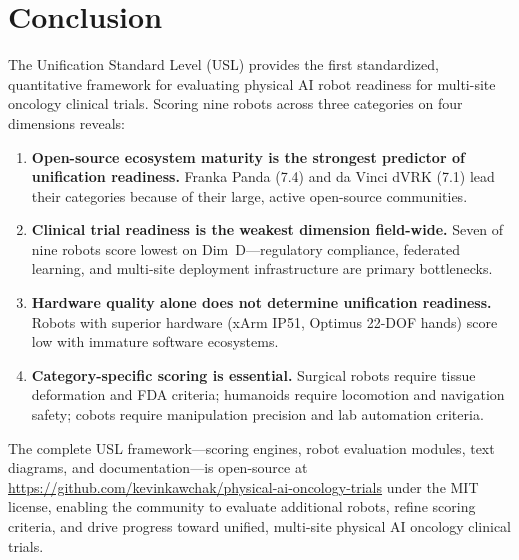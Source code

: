 \documentclass[11pt,a4paper]{article}
\begin{document}
\section{Conclusion}
\label{sec:conclusion}

The Unification Standard Level (USL) provides the first standardized, quantitative framework for evaluating physical AI robot readiness for multi-site oncology clinical trials. Scoring nine robots across three categories on four dimensions reveals:

\begin{enumerate}
  \item \textbf{Open-source ecosystem maturity is the strongest predictor of unification readiness.} Franka Panda (7.4) and da Vinci dVRK (7.1) lead their categories because of their large, active open-source communities.
  \item \textbf{Clinical trial readiness is the weakest dimension field-wide.} Seven of nine robots score lowest on Dim~D---regulatory compliance, federated learning, and multi-site deployment infrastructure are primary bottlenecks.
  \item \textbf{Hardware quality alone does not determine unification readiness.} Robots with superior hardware (xArm IP51, Optimus 22-DOF hands) score low with immature software ecosystems.
  \item \textbf{Category-specific scoring is essential.} Surgical robots require tissue deformation and FDA criteria; humanoids require locomotion and navigation safety; cobots require manipulation precision and lab automation criteria.
\end{enumerate}

The complete USL framework---scoring engines, robot evaluation modules, text diagrams, and documentation---is open-source at \url{https://github.com/kevinkawchak/physical-ai-oncology-trials} under the MIT license, enabling the community to evaluate additional robots, refine scoring criteria, and drive progress toward unified, multi-site physical AI oncology clinical trials.




\end{document}
